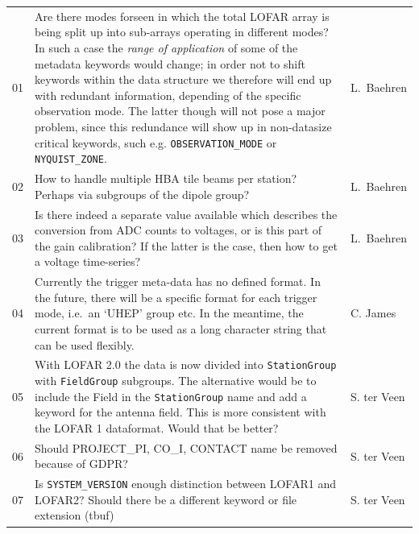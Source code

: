 \documentclass[a4paper,10pt,bibtotoc]{scrartcl}
\begin{document}
\begin{center}
  \tablelasttail{\hline}
  \begin{supertabular}{lp{12.8cm}l}
    01 & Are there modes forseen in which the total LOFAR array is being split up
    into sub-arrays operating in different modes? In such a case the
    \textsl{range of application} of some of the metadata
    keywords would change; in order not to shift keywords within the data structure
    we therefore will end up with redundant information, depending of the specific
    observation mode. The latter though will not pose a major problem, since this
    redundance will show up in non-datasize critical keywords, such e.g.
    \verb|OBSERVATION_MODE| or \verb|NYQUIST_ZONE|. & L.\ Baehren \\
    02 & How to handle multiple HBA tile beams per station? Perhaps via subgroups of the dipole group? & L.\ Baehren \\
    03 & Is there indeed a separate value available which describes
    the conversion from ADC counts to voltages, or is this part of the
    gain calibration? If the latter is the case, then how to get a
    voltage time-series? & L.\ Baehren \\
    04 & Currently the trigger meta-data has no defined format. In the
    future, there will be a specific format for each trigger mode,
    i.e.\ an `UHEP' group etc. In the meantime, the current format is
    to be used as a long character string that can be used flexibly. & C. James \\
    05 & With LOFAR 2.0 the data is now divided into \texttt{StationGroup} with \texttt{FieldGroup} subgroups. The alternative would be to include the Field in the \texttt{StationGroup} name and add a keyword for the antenna field. This is more consistent with the LOFAR 1 dataformat. Would that be better? & S. ter Veen \\
    06 & Should PROJECT\_PI, CO\_I, CONTACT name be removed because of GDPR? & S. ter Veen \\
    07 & Is \texttt{SYSTEM\_VERSION} enough distinction between LOFAR1 and LOFAR2? Should there be a different keyword or file extension (tbuf) & S. ter Veen \\
 \end{supertabular}
\end{center}
\end{document}
